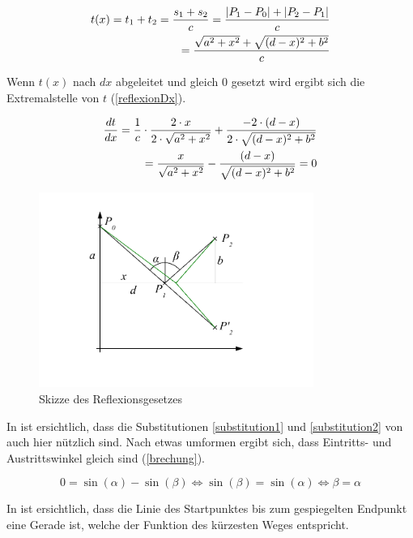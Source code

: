 \begin{align}
t(x) = t_1 + t_2 = \frac{s_1 + s_2}{c} = \frac{|P_1 - P_0| + |P_2 - P_1|}{c} \notag \\
= \frac{\sqrt{a^2 + x^2} + \sqrt{(d-x)^2 + b^2}}{c} \label{reflexion}
\end{align}

Wenn $t(x)$ nach $dx$ abgeleitet und gleich 0 gesetzt wird ergibt sich die Extremalstelle  von $t$ (\eqref{reflexionDx}).

\begin{align}
\frac{dt}{dx} = \frac{1}{c} \cdot \frac{2 \cdot x}{2 \cdot \sqrt{a^2 + x^2}} + \frac{-2 \cdot (d-x)}{2 \cdot \sqrt{(d-x)^2 + b^2}} \notag \\
= \frac{x}{ \sqrt{a^2 + x^2}} - \frac{(d-x)}{ \sqrt{(d-x)^2 + b^2}} = 0 \label{reflexionDx}
\end{align}

\begin{figure}[H]
	\includegraphics[width=0.8\textwidth]{./picture/Spiegelung.pdf}
	\caption{Skizze des Reflexionsgesetzes}
	\label{Ab:spiegelung}
\end{figure}

In  ist ersichtlich, dass die Substitutionen \ref{substitution1} und \ref{substitution2} von  auch hier nützlich sind.
Nach etwas umformen ergibt sich, dass Eintritts- und Austrittswinkel gleich sind (\eqref{brechung}).


\begin{equation}
0 = \sin(\alpha) - \sin(\beta) \Leftrightarrow \sin(\beta) = \sin(\alpha) \Leftrightarrow\beta = \alpha
\label{brechung}
\end{equation}

In  ist ersichtlich, dass die Linie des Startpunktes bis zum 
gespiegelten Endpunkt eine Gerade ist, welche der Funktion des kürzesten Weges entspricht.

